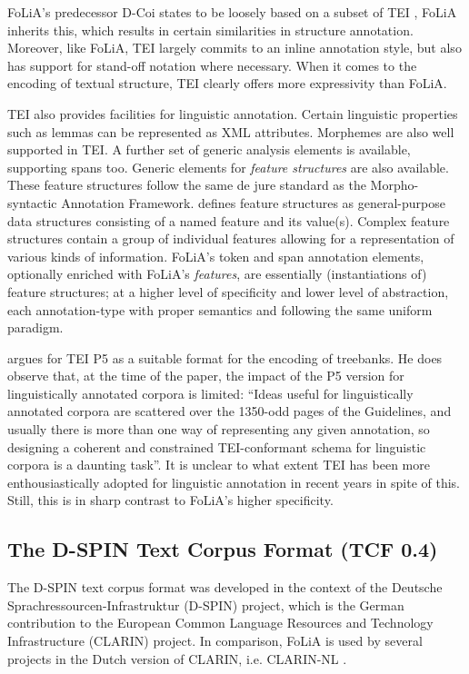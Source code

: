 \documentclass[a4paper,10pt,twoside]{article}
\begin{document}
FoLiA's predecessor D-Coi states to be loosely based on a subset of TEI
\cite{DCOI}, FoLiA inherits this, which results in certain similarities in
structure annotation. Moreover, like FoLiA, TEI largely commits to an inline
annotation style, but also has support for stand-off notation where necessary.
When it comes to the encoding of textual structure, TEI clearly offers more
expressivity than FoLiA. 

TEI also provides facilities for linguistic annotation. Certain linguistic
properties such as lemmas can be represented as XML attributes.  Morphemes are
also well supported in TEI. A further set of generic analysis elements is
available, supporting spans too. Generic elements for \emph{feature structures}
are also available. These feature structures follow the same de jure standard
as the Morpho-syntactic Annotation Framework.  defines
feature structures as general-purpose data structures consisting of a named
feature and its value(s). Complex feature structures contain a group of
individual features allowing for a representation of various kinds of
information. FoLiA's token and span annotation elements, optionally enriched
with FoLiA's \emph{features}, are essentially (instantiations of) feature
structures; at a higher level of specificity and lower level of abstraction,
each annotation-type with proper semantics and following the same uniform
paradigm.

 argues for TEI P5 as a suitable format for the encoding of
treebanks. He does observe that, at the time of the paper, the impact of the P5
version for linguistically annotated corpora is limited: ``Ideas useful for
linguistically annotated corpora are scattered over the 1350-odd pages of the
Guidelines, and usually there is more than one way of representing any given
annotation, so designing a coherent and constrained TEI-conformant schema for
linguistic corpora is a daunting task''.  It is unclear to what extent TEI has
been more enthousiastically adopted for linguistic annotation in recent years
in spite of this. Still, this is in sharp contrast to FoLiA's higher specificity.


\subsection{The D-SPIN Text Corpus Format (TCF 0.4)}

The D-SPIN text corpus format \cite{TCF} was developed in the context of the
Deutsche Sprachressourcen-Infrastruktur (D-SPIN) project, which is the
German contribution to the European Common Language Resources and Technology
Infrastructure (CLARIN) project. In comparison, FoLiA is used by several
projects in the Dutch version of CLARIN, i.e. CLARIN-NL  \cite{CLARINNL}.
\end{document}
